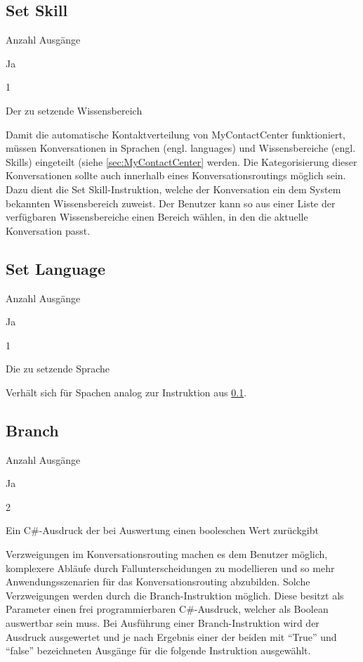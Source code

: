 \subsection{Set Skill}
\label{subsec:Set Skill}
\begin{labeling}{Anzahl Ausgänge}
\item [Eingang] Ja
\item [Anzahl Ausgänge] 1
\item [Parameter] Der zu setzende Wissensbereich
\item [Beschreibung] Damit die automatische Kontaktverteilung von MyContactCenter funktioniert, müssen Konversationen in Sprachen (engl. languages) und Wissensbereiche (engl. Skills) eingeteilt (siehe \ref{sec:MyContactCenter} werden. Die Kategorisierung dieser Konversationen sollte auch innerhalb eines Konversationsroutings möglich sein. Dazu dient die Set Skill-Instruktion, welche der Konversation ein dem System bekannten Wissensbereich zuweist. Der Benutzer kann so aus einer Liste der verfügbaren Wissensbereiche einen Bereich wählen, in den die aktuelle Konversation passt.
\end{labeling}

\subsection{Set Language}
\label{subsec:Set Language}
\begin{labeling}{Anzahl Ausgänge}
\item [Eingang] Ja
\item [Anzahl Ausgänge] 1
\item [Parameter] Die zu setzende Sprache
\item [Beschreibung] Verhält sich für Spachen analog zur Instruktion aus \ref{subsec:Set Skill}.
\end{labeling}

\subsection{Branch}
\begin{labeling}{Anzahl Ausgänge}
\item [Eingang] Ja
\item [Anzahl Ausgänge] 2
\item [Parameter] Ein C\#-Ausdruck der bei Auswertung einen booleschen Wert zurückgibt
\item [Beschreibung] Verzweigungen im Konversationsrouting machen es dem Benutzer möglich, komplexere Abläufe durch Fallunterscheidungen zu modellieren und so mehr Anwendungsszenarien für das Konversationsrouting abzubilden. Solche Verzweigungen werden durch die  Branch-Instruktion möglich. Diese besitzt als Parameter einen frei programmierbaren C\#-Ausdruck, welcher als Boolean auswertbar sein muss. Bei Ausführung einer Branch-Instruktion wird der Ausdruck ausgewertet und je nach Ergebnis einer der beiden mit ``True'' und ``false'' bezeichneten  Ausgänge für die folgende Instruktion ausgewählt.
\end{labeling}

